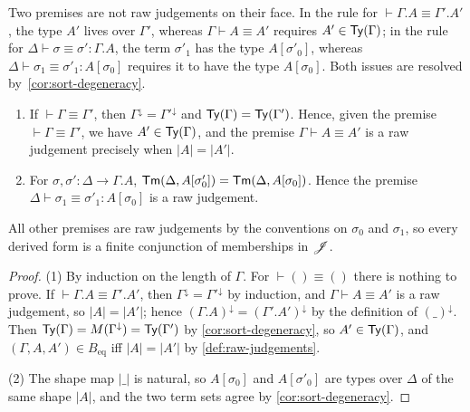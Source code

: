 Two premises are not raw judgements on their face. In the rule for $\vdash \Gamma.A \equiv \Gamma'.A'$, the type $A'$ lives over $\Gamma'$, whereas $\Gamma \vdash A \equiv A'$ requires $A' \in \mathsf{Ty}(\Gamma)$; in the rule for $\Delta \vdash \sigma \equiv \sigma' : \Gamma.A$, the term $\sigma'_1$ has the type $A[\sigma'_0]$, whereas $\Delta \vdash \sigma_1 \equiv \sigma'_1 : A[\sigma_0]$ requires it to have the type $A[\sigma_0]$. Both issues are resolved by~\cref{cor:sort-degeneracy}.

\begin{lemma}\label{lem:derived-forms}
    \begin{enumerate}
        \item If $\vdash \Gamma \equiv \Gamma'$, then $\Gamma^{\downarrow} = \Gamma'^{\downarrow}$ and $\mathsf{Ty}(\Gamma) = \mathsf{Ty}(\Gamma')$. Hence, given the premise $\vdash \Gamma \equiv \Gamma'$, we have $A' \in \mathsf{Ty}(\Gamma)$, and the premise $\Gamma \vdash A \equiv A'$ is a raw judgement precisely when $|A| = |A'|$.
        \item For $\sigma, \sigma' : \Delta \to \Gamma.A$, $\mathsf{Tm}(\Delta, A[\sigma'_0]) = \mathsf{Tm}(\Delta, A[\sigma_0])$. Hence the premise $\Delta \vdash \sigma_1 \equiv \sigma'_1 : A[\sigma_0]$ is a raw judgement.
    \end{enumerate}
    All other premises are raw judgements by the conventions on $\sigma_0$ and $\sigma_1$, so every derived form is a finite conjunction of memberships in $\mathscr{J}$.
\end{lemma}

\begin{proof}
    (1) By induction on the length of $\Gamma$. For $\vdash () \equiv ()$ there is nothing to prove. If $\vdash \Gamma.A \equiv \Gamma'.A'$, then $\Gamma^{\downarrow} = \Gamma'^{\downarrow}$ by induction, and $\Gamma \vdash A \equiv A'$ is a raw judgement, so $|A| = |A'|$; hence $(\Gamma.A)^{\downarrow} = (\Gamma'.A')^{\downarrow}$ by the definition of $(\_)^{\downarrow}$. Then $\mathsf{Ty}(\Gamma) = M(\Gamma^{\downarrow}) = \mathsf{Ty}(\Gamma')$ by \cref{cor:sort-degeneracy}, so $A' \in \mathsf{Ty}(\Gamma)$, and $(\Gamma, A, A') \in B_{\mathrm{eq}}$ iff $|A| = |A'|$ by \cref{def:raw-judgements}.

    (2) The shape map $|\_|$ is natural, so $A[\sigma_0]$ and $A[\sigma'_0]$ are types over $\Delta$ of the same shape $|A|$, and the two term sets agree by \cref{cor:sort-degeneracy}.
\end{proof}

